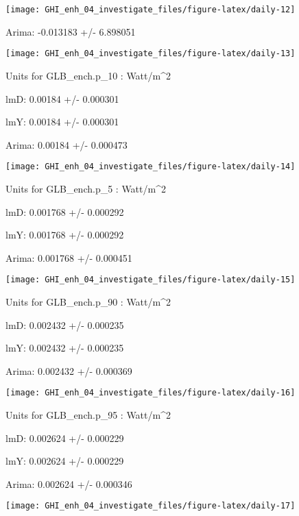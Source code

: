 \documentclass[
  10pt,
  a4paper,oneside]{article}
\begin{document}
\begin{center}\texttt{[image: GHI\_enh\_04\_investigate\_files/figure-latex/daily-12]} \end{center}

Arima: -0.013183 +/- 6.898051

\begin{center}\texttt{[image: GHI\_enh\_04\_investigate\_files/figure-latex/daily-13]} \end{center}

Units for GLB\_ench.p\_10 : Watt/m\^{}2

lmD: 0.00184 +/- 0.000301

lmY: 0.00184 +/- 0.000301

Arima: 0.00184 +/- 0.000473

\begin{center}\texttt{[image: GHI\_enh\_04\_investigate\_files/figure-latex/daily-14]} \end{center}

Units for GLB\_ench.p\_5 : Watt/m\^{}2

lmD: 0.001768 +/- 0.000292

lmY: 0.001768 +/- 0.000292

Arima: 0.001768 +/- 0.000451

\begin{center}\texttt{[image: GHI\_enh\_04\_investigate\_files/figure-latex/daily-15]} \end{center}

Units for GLB\_ench.p\_90 : Watt/m\^{}2

lmD: 0.002432 +/- 0.000235

lmY: 0.002432 +/- 0.000235

Arima: 0.002432 +/- 0.000369

\begin{center}\texttt{[image: GHI\_enh\_04\_investigate\_files/figure-latex/daily-16]} \end{center}

Units for GLB\_ench.p\_95 : Watt/m\^{}2

lmD: 0.002624 +/- 0.000229

lmY: 0.002624 +/- 0.000229

Arima: 0.002624 +/- 0.000346

\begin{center}\texttt{[image: GHI\_enh\_04\_investigate\_files/figure-latex/daily-17]} \end{center}
\end{document}
